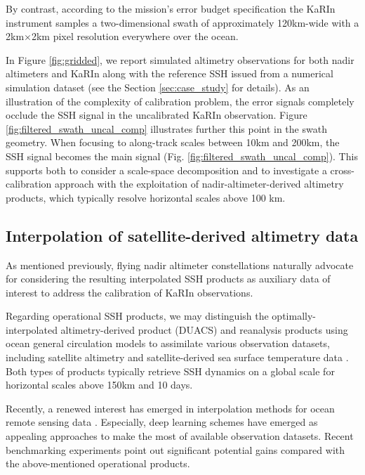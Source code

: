 \begin{bibunit}
By contrast, according to the mission's error budget specification \cite{Peral_Esteban-Fernandez_2018} the KaRIn instrument samples a two-dimensional swath of approximately 120km-wide with a 2km$\times$2km pixel resolution everywhere over the ocean.


In Figure \ref{fig:gridded}, we report simulated altimetry observations for both nadir altimeters and KaRIn along with the reference SSH issued from a numerical simulation dataset (see  the Section \ref{sec:case_study} for details). As an illustration of the complexity of calibration problem, the error signals completely occlude the SSH signal in the uncalibrated KaRIn observation.
Figure \ref{fig:filtered_swath_uncal_comp} illustrates further this point in the swath geometry. When focusing to along-track scales between 10km and 200km, the SSH signal becomes the main signal (Fig. \ref{fig:filtered_swath_uncal_comp}). This supports
both to consider a scale-space decomposition and to 
investigate a cross-calibration approach with
the exploitation of nadir-altimeter-derived altimetry products, which typically resolve horizontal scales above 100 km.


\subsection{Interpolation of satellite-derived altimetry data}
\label{subsec:interpolation}

As mentioned previously, flying nadir altimeter constellations naturally advocate for considering the resulting interpolated SSH products as auxiliary data of interest to address the calibration of KaRIn observations. 

Regarding operational SSH products, we may distinguish the optimally-interpolated altimetry-derived product (DUACS) \cite{taburet_duacs_2019} and reanalysis products using ocean general circulation models to assimilate various observation datasets, including satellite altimetry and satellite-derived sea surface temperature data \cite{glorys_rea_2021}. Both types of products typically retrieve SSH dynamics on a global scale for horizontal scales above 150km and 10 days. 

Recently, a renewed interest has emerged in interpolation methods for ocean remote sensing data \cite{beauchamp_intercomparison_2020}\cite{fablet_end2end_2021}. Especially, deep learning schemes have emerged as appealing approaches to make the most of available observation datasets. Recent benchmarking experiments \cite{osse_data_challenge} point out significant potential gains compared with the above-mentioned operational products.


\end{bibunit}
